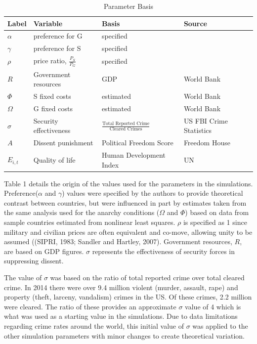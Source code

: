 \documentclass[12pt]{article}
\begin{document}
\begin{spacing}{1.5}
\begin{spacing}{1}
\begin{table}[]
\centering
\footnotesize
\begin{tabular}{llll}
\toprule
\textbf{Label} & \textbf{Variable} & \textbf{Basis} & \textbf{Source} \\ \hline
$\alpha$ & preference for G & specified &  \\
\textbf{$\gamma$} & preference for S & specified &  \\
$\rho$ & price ratio, $\frac{P_S}{P_G}$ & specified & \\
\textbf{$R$} & Government resources & GDP & World Bank \\
$\Phi$ & S fixed costs & estimated & World Bank \\
\textbf{$\Omega$} & G fixed costs & estimated & World Bank \\
\textbf{$\sigma$} & Security effectiveness & $\frac{\text{Total Reported Crime}}{\text{Cleared Crimes}}$ & US FBI Crime Statistics \\
\textbf{$A$} & Dissent punishment & Political Freedom Score & Freedom House \\
\textbf{$E_{i,t}$} & Quality of life & Human Development Index & UN \\ \hline
\end{tabular}
\caption{Parameter Basis}
\end{table}
\end{spacing}


Table 1 details the origin of the values used for the parameters in the simulations. Preference($\alpha$ and $\gamma$) values were specified by the authors to provide theoretical contrast between countries, but were influenced in part by estimates taken from the same analysis used for the anarchy conditions ($\Omega$ and $\Phi$) based on data from sample countries estimated from nonlinear least squares. $\rho$ is specified as 1 since military and civilian prices are often equivalent and co-move, allowing unity to be assumed ((SIPRI, 1983; Sandler and Hartley, 2007). Government resources, $R$, are based on GDP figures. $\sigma$ represents the effectiveness of security forces in suppressing dissent. 

The value of $\sigma$ was based on the ratio of total reported crime over total cleared crime. In 2014 there were over 9.4 million violent (murder, assault, rape) and property (theft, larceny, vandalism) crimes in the US. Of these crimes, 2.2 million were cleared. The ratio of these provides an approximate $\sigma$ value of 4 which is what was used as a starting value in the simulations. Due to data limitations regarding crime rates around the world, this initial value of $\sigma$ was applied to the other simulation parameters with minor changes to create theoretical variation. 



\end{spacing}
\end{document}
